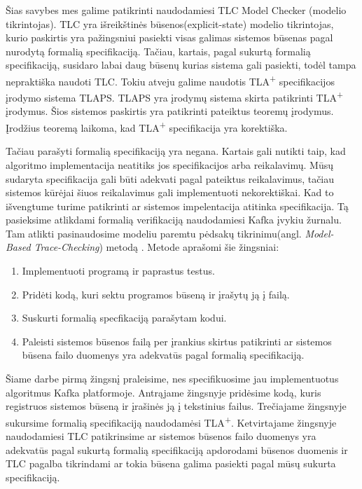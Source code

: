 \documentclass{VUMIFPSmagistrinis}
\begin{document}
	Šias savybes mes galime patikrinti naudodamiesi TLC Model Checker (modelio tikrintojas).
		TLC yra išreikštinės būsenos(explicit-state) modelio tikrintojas, kurio paskirtis yra pažingsniui pasiekti visas galimas sistemos būsenas pagal nurodytą formalią specifikaciją.
		Tačiau, kartais, pagal sukurtą formalią specifikaciją, susidaro labai daug būsenų kurias sistema gali pasiekti, todėl tampa nepraktiška naudoti TLC.
		Tokiu atveju galime naudotis TLA\textsuperscript{+} specifikacijos įrodymo sistema TLAPS.
		TLAPS yra įrodymų sistema skirta patikrinti TLA\textsuperscript{+} įrodymus.
		Šios sistemos paskirtis yra patikrinti pateiktus teoremų įrodymus.
		Įrodžius teoremą laikoma, kad TLA\textsuperscript{+} specifikacija yra korektiška.


		Tačiau parašyti formalią specifikaciją yra negana.
		Kartais gali nutikti taip, kad algoritmo implementacija neatitiks jos specifikacijos arba reikalavimų.
		Mūsų sudaryta specifikacija gali būti adekvati pagal pateiktus reikalavimus, tačiau sistemos kūrėjai šiuos reikalavimus gali implementuoti nekorektiškai.
		Kad to išvengtume turime patikrinti ar sistemos impelentacija atitinka specifikacija.
		Tą pasieksime atlikdami formalią verifikaciją naudodamiesi Kafka įvykiu žurnalu.
		Tam atlikti pasinaudosime modeliu paremtu pėdsakų tikrinimu(angl. {\it Model-Based Trace-Checking}) metodą \cite{ltx}.
		Metode aprašomi šie žingsniai:
		\begin{enumerate}
			\item{Implementuoti programą ir paprastus testus.}
			\item{Pridėti kodą, kuri sektu programos būseną ir įrašytų ją į failą.}
			\item{Suskurti formalią specfikaciją parašytam kodui.}
			\item{Paleisti sistemos būsenos failą per įrankius skirtus patikrinti ar sistemos būsena failo duomenys yra adekvatūs pagal formalią specifikaciją.}
		\end{enumerate}

		Šiame darbe pirmą žingsnį praleisime, nes specifikuosime jau implementuotus algoritmus Kafka platformoje.
		Antrąjame žingsnyje pridėsime kodą, kuris registruos sistemos būseną ir įrašinės ją į tekstinius failus.
		Trečiajame žingsnyje sukursime formalią specifikaciją naudodamėsi TLA\textsuperscript{+}.
		Ketvirtajame žingsnyje naudodamiesi TLC patikrinsime ar sistemos būsenos failo duomenys yra adekvatūs pagal sukurtą formalią specifikaciją apdorodami būsenos duomenis ir TLC pagalba tikrindami ar tokia būsena galima pasiekti pagal mūsų sukurta specifikaciją.
\end{document}
